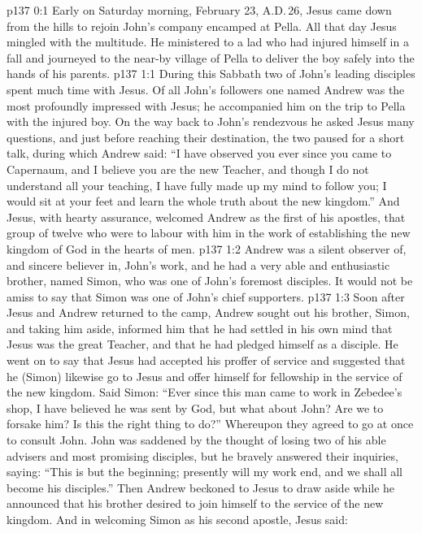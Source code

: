\author{Midwayer Commission}
\vs p137 0:1 Early on Saturday morning, February 23, A.D.\,26, Jesus came down from the hills to rejoin John’s company encamped at Pella. All that day Jesus mingled with the multitude. He ministered to a lad who had injured himself in a fall and journeyed to the near-by village of Pella to deliver the boy safely into the hands of his parents.
\vs p137 1:1 During this Sabbath two of John’s leading disciples spent much time with Jesus. Of all John’s followers one named Andrew was the most profoundly impressed with Jesus; he accompanied him on the trip to Pella with the injured boy. On the way back to John’s rendezvous he asked Jesus many questions, and just before reaching their destination, the two paused for a short talk, during which Andrew said: “I have observed you ever since you came to Capernaum, and I believe you are the new Teacher, and though I do not understand all your teaching, I have fully made up my mind to follow you; I would sit at your feet and learn the whole truth about the new kingdom.” And Jesus, with hearty assurance, welcomed Andrew as the first of his apostles, that group of twelve who were to labour with him in the work of establishing the new kingdom of God in the hearts of men.
\vs p137 1:2 \pc Andrew was a silent observer of, and sincere believer in, John’s work, and he had a very able and enthusiastic brother, named Simon, who was one of John’s foremost disciples. It would not be amiss to say that Simon was one of John’s chief supporters.
\vs p137 1:3 Soon after Jesus and Andrew returned to the camp, Andrew sought out his brother, Simon, and taking him aside, informed him that he had settled in his own mind that Jesus was the great Teacher, and that he had pledged himself as a disciple. He went on to say that Jesus had accepted his proffer of service and suggested that he (Simon) likewise go to Jesus and offer himself for fellowship in the service of the new kingdom. Said Simon: “Ever since this man came to work in Zebedee’s shop, I have believed he was sent by God, but what about John? Are we to forsake him? Is this the right thing to do?” Whereupon they agreed to go at once to consult John. John was saddened by the thought of losing two of his able advisers and most promising disciples, but he bravely answered their inquiries, saying: “This is but the beginning; presently will my work end, and we shall all become his disciples.” Then Andrew beckoned to Jesus to draw aside while he announced that his brother desired to join himself to the service of the new kingdom. And in welcoming Simon as his second apostle, Jesus said: 
